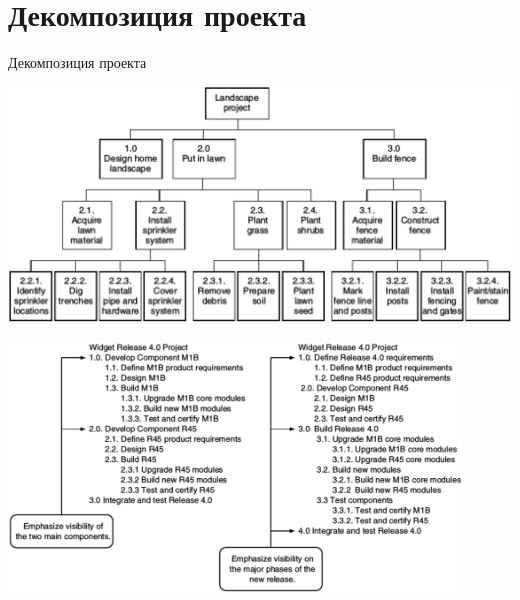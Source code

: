 \documentclass{../../slides-style}
\begin{document}
    \section{Декомпозиция проекта}

    \begin{frame}{Декомпозиция проекта}
        \begin{center}
            \includegraphics[width=\textwidth]{wbsExample.png}
        \end{center}
    \end{frame}

    \begin{frame}
        \begin{center}
            \includegraphics[width=0.9\textwidth]{wbsExample2.png}
        \end{center}
    \end{frame}
\end{document}

